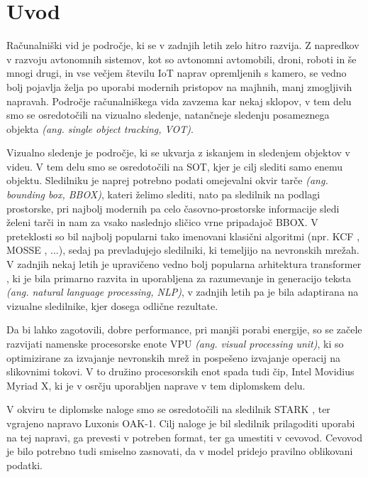 \documentclass[a4paper,12pt,openright]{book}
\begin{document}
\mainmatter
\setcounter{page}{1}
\pagestyle{fancy}

\chapter{Uvod}
Računalniški vid je področje, ki se v zadnjih letih zelo hitro razvija. Z napredkov v razvoju avtonomnih sistemov, kot so avtonomni avtomobili, droni, roboti in še mnogi drugi, in vse večjem številu IoT naprav opremljenih s kamero, se vedno bolj pojavlja želja po uporabi modernih pristopov na majhnih, manj zmogljivih napravah. Področje računalniškega vida zavzema kar nekaj sklopov, v tem delu smo se osredotočili na vizualno sledenje, natančneje sledenju posameznega objekta \emph{(ang. single object tracking, VOT)}.

Vizualno sledenje je področje, ki se ukvarja z iskanjem in sledenjem objektov v videu. V tem delu smo se osredotočili na SOT, kjer je cilj slediti samo enemu objektu. Sledilniku je naprej potrebno podati omejevalni okvir tarče \emph{(ang. bounding box, BBOX)}, kateri želimo slediti, nato pa sledilnik na podlagi prostorske, pri najbolj modernih pa celo časovno-prostorske informacije sledi želeni tarči in nam za vsako naslednjo sličico vrne pripadajoč BBOX. V preteklosti so bil najbolj popularni tako imenovani klasični algoritmi (npr. KCF \cite{kcf}, MOSSE \cite{mosse}, ...), sedaj pa prevladujejo sledilniki, ki temeljijo na nevronskih mrežah. V zadnjih nekaj letih je upravičeno vedno bolj popularna arhitektura transformer \cite{attention_is_all_you_need}, ki je bila primarno razvita in uporabljena za razumevanje in generacijo teksta \emph{(ang. natural language processing, NLP)}, v zadnjih letih pa je bila adaptirana na vizualne sledilnike, kjer dosega odlične rezultate.

Da bi lahko zagotovili, dobre performance, pri manjši porabi energije, so se začele razvijati namenske procesorske enote VPU \emph{(ang. visual processing unit)}, ki so optimizirane za izvajanje nevronskih mrež in pospešeno izvajanje operacij na slikovnimi tokovi. V to družino procesorskih enot spada tudi čip, Intel Movidius Myriad X, ki je v osrčju uporabljen naprave v tem diplomskem delu.

V okviru te diplomske naloge smo se osredotočili na sledilnik STARK \cite{stark}, ter vgrajeno napravo Luxonis OAK-1. Cilj naloge je bil sledilnik prilagoditi uporabi na tej napravi, ga prevesti v potreben format, ter ga umestiti v cevovod. Cevovod je bilo potrebno tudi smiselno zasnovati, da v model pridejo pravilno oblikovani podatki.
\end{document}
